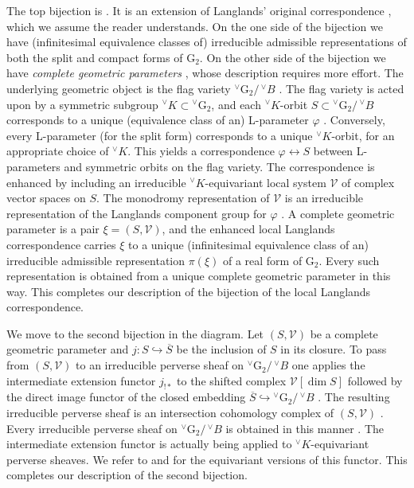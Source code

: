 \documentclass[a4paper, 11pt]{article}
\begin{document}
The top bijection is \cite[Theorem 10.4]{ABV}.  It is an extension of
Langlands' original correspondence \cite{Langlands}, which we
assume the reader understands.  On the one side of the
bijection we have
(infinitesimal equivalence classes of) irreducible admissible
representations of both the split and compact forms of
$\mathrm{G}_{2}$.  On the other side of the bijection we have
\emph{complete geometric parameters} \cite[Definition 7.6]{ABV}, whose
description requires more effort.  The underlying geometric object is
the flag variety ${^\vee}\mathrm{G}_{2}/ \, {^\vee}B$
\cite[Proposition 6.16]{ABV}.  The flag
variety is acted upon by a symmetric  subgroup ${^\vee}K \subset
{^\vee}\mathrm{G}_{2}$, and each ${^\vee}K$-orbit $S \subset
{^\vee}\mathrm{G}_{2}/ \, {^\vee}B$ corresponds to a
unique (equivalence class of an) L-parameter $\varphi$
\cite[Proposition 6.17]{ABV}.  Conversely, every L-parameter (for the
split form) corresponds to a unique ${^\vee}K$-orbit, for an
appropriate choice of ${^\vee}K$.  This yields a correspondence $\varphi
\leftrightarrow S$
between L-parameters and symmetric orbits on the flag variety. The
correspondence is enhanced by including an irreducible
${^\vee}K$-equivariant local system
$\mathcal{V}$ of complex vector spaces on $S$.  The monodromy
representation of $\mathcal{V}$ is an irreducible representation of the
Langlands component group for $\varphi$ \cite[Lemma 7.5]{ABV}.  A
complete geometric parameter is  a pair $\xi = (S, \mathcal{V})$,
and the enhanced local Langlands correspondence carries $\xi$ to a unique
(infinitesimal equivalence class of an) irreducible admissible
representation $\pi(\xi)$ of a real form of $\mathrm{G}_{2}$.  Every
such representation is obtained from a unique complete geometric
parameter in this way.  This completes our description of the
bijection of the local Langlands correspondence.

We move to the second bijection in the diagram.  Let
$(S, \mathcal{V})$ be a complete geometric parameter and $j: S
\hookrightarrow \overline{S}$ be the inclusion of $S$ in its closure.  
To pass from $(S, \mathcal{V})$ to an
irreducible perverse sheaf on ${^\vee}\mathrm{G}_{2}/ \, {^\vee}B$ one
applies the intermediate extension functor $j_{!*}$ to the shifted
complex $\mathcal{V}[\dim S]$ followed by the direct image functor of
the closed embedding $\overline{S} \hookrightarrow
{^\vee}\mathrm{G}_{2}/ \, {^\vee}B$  \cite[(7.10)]{ABV}.
The resulting irreducible perverse sheaf is an
intersection cohomology complex of $(S,\mathcal{V})$ \cite[Definition
  3.3.9]{Achar}.  Every irreducible perverse sheaf on
${^\vee}\mathrm{G}_{2}/ \, {^\vee}B$ is obtained in this manner
\cite[Theorem 3.4.5]{Achar}.
The intermediate extension functor is actually being applied to
${^\vee}K$-equivariant perverse sheaves.  We refer to
\cite[I.5.2]{Lunts} and \cite[Section 6.5]{Achar} for the equivariant
versions of this functor.   This completes our
description of the second bijection. 
\end{document}
